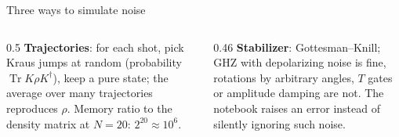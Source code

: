 \documentclass[aspectratio=169,11pt]{beamer}
\newcommand{\key}[1]{{\color{qdark}\textbf{#1}}}
\begin{document}
\begin{frame}[label=fMethods]{Three ways to simulate noise}
  \footnotesize
  \begin{center}
  \end{center}
  \begin{columns}[T]
    \begin{column}{0.5\textwidth}
      \scriptsize
      \key{Trajectories}: for each shot, pick Kraus jumps at random (probability $\operatorname{Tr}K\rho K^\dagger$), keep a pure state; the average over many
      trajectories reproduces $\rho$. Memory ratio to the density matrix at $N = 20$: $2^{20} \approx 10^6$.
    \end{column}
    \begin{column}{0.46\textwidth}
      \scriptsize
      \key{Stabilizer}: Gottesman--Knill; GHZ with depolarizing noise is fine, rotations by arbitrary angles, $T$ gates or amplitude damping are not.
      The notebook raises an error instead of silently ignoring such noise.
    \end{column}
  \end{columns}
\end{frame}
\end{document}
